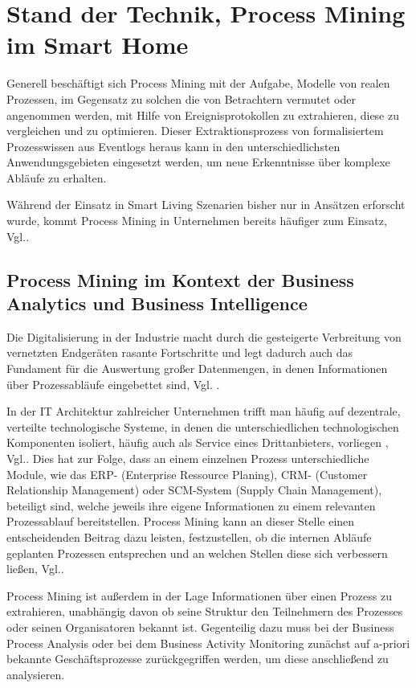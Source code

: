 \chapter{Stand der Technik, Process Mining im Smart Home}\label{chap:stateoftheart}

Generell beschäftigt sich Process Mining mit der Aufgabe, Modelle von realen Prozessen, im Gegensatz zu solchen die von Betrachtern vermutet oder angenommen werden, mit Hilfe von Ereignisprotokollen zu extrahieren, diese zu vergleichen und zu optimieren.\cite{PMinAction}
Dieser Extraktionsprozess von formalisiertem Prozesswissen aus Eventlogs heraus kann in den  unterschiedlichsten Anwendungsgebieten eingesetzt werden, um neue Erkenntnisse über komplexe Abläufe zu erhalten. 

Während der Einsatz in Smart Living Szenarien bisher nur in Ansätzen erforscht wurde, kommt Process Mining in Unternehmen bereits häufiger zum Einsatz, Vgl.\cite{litreview}.

\section{Process Mining im Kontext der Business Analytics und Business Intelligence}

Die Digitalisierung in der Industrie macht durch die gesteigerte Verbreitung von vernetzten Endgeräten rasante Fortschritte und legt dadurch auch das Fundament für die Auswertung großer Datenmengen, in denen Informationen über Prozessabläufe eingebettet sind, Vgl. \cite{GanscharGerlac}. 

In der IT Architektur zahlreicher Unternehmen trifft man häufig auf dezentrale, verteilte technologische Systeme, in denen die unterschiedlichen technologischen Komponenten isoliert, häufig auch als Service eines Drittanbieters, vorliegen , Vgl.\cite{GanscharGerlac}. Dies hat zur Folge, dass an einem einzelnen Prozess unterschiedliche Module, wie das ERP- (Enterprise Ressource Planing), CRM- (Customer Relationship Management) oder SCM-System (Supply Chain Management), beteiligt sind, welche jeweils ihre eigene Informationen zu einem relevanten Prozessablauf bereitstellen. Process Mining kann an dieser Stelle einen entscheidenden Beitrag dazu leisten, festzustellen, ob die internen Abläufe geplanten Prozessen entsprechen und an welchen Stellen diese sich verbessern ließen, Vgl.\cite{PMinAction}.

Process Mining ist außerdem in der Lage Informationen über einen Prozess zu extrahieren, unabhängig davon ob seine Struktur den Teilnehmern des Prozesses oder seinen Organisatoren bekannt ist. Gegenteilig dazu muss bei der Business Process Analysis oder bei dem Business Activity Monitoring zunächst auf a-priori bekannte Geschäftsprozesse zurückgegriffen werden, um diese anschließend zu analysieren. 

